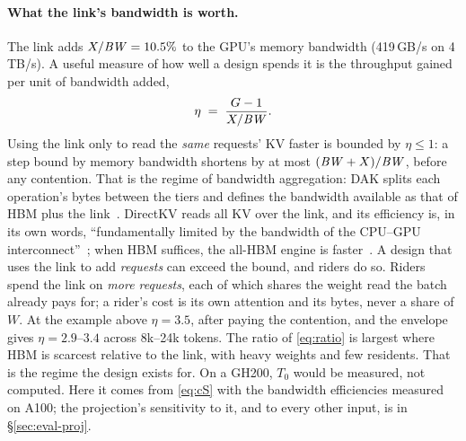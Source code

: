 \paragraph{What the link's bandwidth is worth.} The link adds $X/\mathit{BW}
= 10.5\%$ to the GPU's memory bandwidth (419\,GB/s on 4\,TB/s). A useful
measure of how well a design spends it is the throughput gained per unit of
bandwidth added,
\begin{equation}
  \eta \;=\; \frac{G - 1}{X/\mathit{BW}} .
  \label{eq:eta}
\end{equation}
Using the link only to read the \emph{same} requests' KV faster is bounded by
$\eta \le 1$: a step bound by memory bandwidth shortens by at most
$(\mathit{BW}+X)/\mathit{BW}$, before any contention. That is the regime
of bandwidth aggregation: DAK splits each operation's bytes between the tiers
and defines the bandwidth available as that of HBM plus the link~\cite{dak}.
DirectKV reads all KV over the link, and its efficiency is, in its own words,
``fundamentally limited by the bandwidth of the CPU--GPU
interconnect''~\cite{directkv}; when HBM suffices, the all-HBM engine is
faster~\cite{directkv}. A design that uses the link to add \emph{requests} can
exceed the bound, and riders do so.
Riders spend the link on \emph{more requests}, each of
which shares the weight read the batch already pays for; a rider's cost is its
own attention and its bytes, never a share of $W$. At the example above
$\eta = 3.5$, after paying the contention, and the envelope gives
$\eta = 2.9$--$3.4$ across 8k--24k tokens. The ratio of
\cref{eq:ratio} is largest where HBM is scarcest relative to the link, with
heavy weights and few residents. That is the regime the design exists for.
On a GH200, $T_0$ would be measured, not computed. Here it comes from
\cref{eq:cS} with the bandwidth efficiencies measured on A100; the projection's
sensitivity to it, and to every other input, is in \S\ref{sec:eval-proj}.
